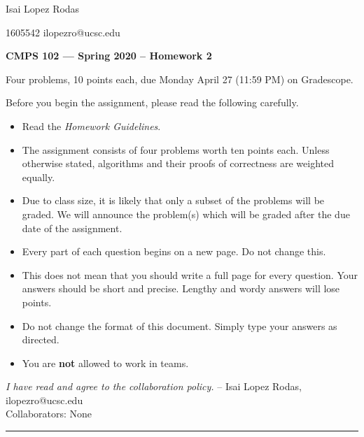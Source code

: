 \documentclass[11pt]{article}
\theoremstyle{definition}
\begin{document}
\hfill Isai  Lopez Rodas  

\hfill 1605542  ilopezro@ucsc.edu

\begin{center}
{\bf\Large 
CMPS 102 --- Spring 2020 --  Homework 2}
\end{center}

\begin{center}
Four problems, 10 points each, due Monday April 27 (11:59 PM) on Gradescope.  \\
\end{center}



\medskip

\renewcommand{\P}{\mbox{IH}}

\noindent
Before you begin the assignment, please read the following carefully.
\begin{itemize}
    \item Read the \emph{Homework Guidelines}.
    \item The assignment consists of four problems worth ten points each. Unless otherwise stated, algorithms and their proofs of correctness are weighted equally.
    \item Due to class size, it is likely that only a subset of the problems will be graded. We will announce the problem(s) which will be graded after the due date of the assignment.
    \item Every part of each question begins on a new page. Do not change this.
    \item This does not mean that you should write a full page for every question. Your answers should be short and precise. Lengthy and wordy answers will lose points.
    \item Do not change the format of this document. Simply type your answers as directed.
    \item You are \textbf{not} allowed to work in teams.
\end{itemize}
\emph{I have read and agree to the collaboration policy.}  -- Isai Lopez Rodas, ilopezro@ucsc.edu
\\
Collaborators: None%
\\
\hrule
\end{document}
